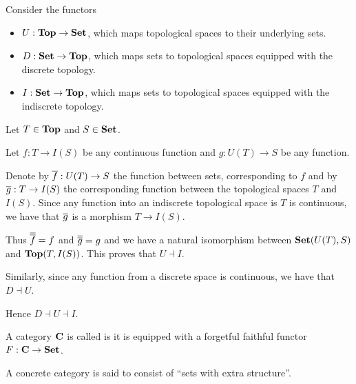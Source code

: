 \begin{example}\label{ex:top_adjoint_functor}\cite[example 2.1.5]{Leinster2014}
  Consider the functors
  \begin{itemize}
    \item $U: \operatorname{\mathbf{Top}} \to \operatorname{\mathbf{Set}}$, which maps topological spaces to their underlying sets.
    \item $D: \operatorname{\mathbf{Set}} \to \operatorname{\mathbf{Top}}$, which maps sets to topological spaces equipped with the discrete topology.
    \item $I: \operatorname{\mathbf{Set}} \to \operatorname{\mathbf{Top}}$, which maps sets to topological spaces equipped with the indiscrete topology.
  \end{itemize}

  Let $T \in \operatorname{\mathbf{Top}}$ and $S \in \operatorname{\mathbf{Set}}$.

  Let $f: T \to I(S)$ be any continuous function and $g: U(T) \to S$ be any function.

  Denote by $\overline{f}: U(T) \to S$ the function between sets, corresponding to $f$ and by $\overline{g}: T \to I(S)$ the corresponding function between the topological spaces $T$ and $I(S)$. Since any function into an indiscrete topological space is $T$ is continuous, we have that $\overline{g}$ is a morphism $T \to I(S)$.

  Thus $\overline{\overline{f}} = f$ and $\overline{\overline{g}} = g$ and we have a natural isomorphism between $\operatorname{\mathbf{Set}}(U(T), S)$ and $\operatorname{\mathbf{Top}}(T, I(S))$. This proves that $U \dashv I$.

  Similarly, since any function from a discrete space is continuous, we have that $D \dashv U$.

  Hence $D \dashv U \dashv I$.
\end{example}

\begin{definition}\label{def:concrete_category}
  A category $\operatorname{\mathbf{C}}$ is called  is it is equipped with a forgetful faithful functor $F: \operatorname{\mathbf{C}} \to \operatorname{\mathbf{Set}}$.

  A concrete category is said to consist of \enquote{sets with extra structure}.
\end{definition}

